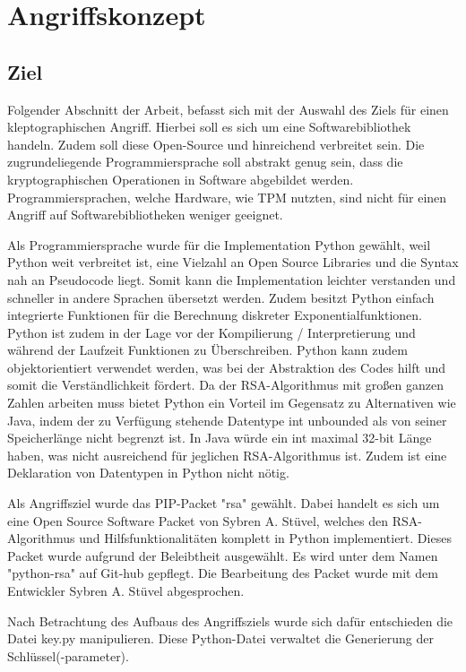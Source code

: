 \chapter{Angriffskonzept}

    \section{Ziel}
        Folgender Abschnitt der Arbeit, befasst sich mit der Auswahl des Ziels für einen kleptographischen Angriff. Hierbei soll es sich um eine Softwarebibliothek handeln. Zudem soll diese Open-Source und hinreichend verbreitet sein. Die zugrundeliegende Programmiersprache soll abstrakt genug sein, dass die kryptographischen Operationen in Software abgebildet werden. Programmiersprachen, welche Hardware, wie \ac{TPM} nutzten, sind nicht für einen Angriff auf Softwarebibliotheken weniger geeignet.

        Als Programmiersprache wurde für die Implementation Python gewählt, weil Python weit verbreitet ist, eine Vielzahl an Open Source Libraries und die Syntax nah an Pseudocode liegt. Somit kann die Implementation leichter verstanden und schneller in andere Sprachen übersetzt werden. Zudem besitzt Python einfach integrierte Funktionen für die Berechnung diskreter Exponentialfunktionen. Python ist zudem in der Lage vor der Kompilierung / Interpretierung und während der Laufzeit Funktionen zu Überschreiben. Python kann zudem objektorientiert verwendet werden, was bei der Abstraktion des Codes hilft und somit die Verständlichkeit fördert. Da der \ac{RSA}-Algorithmus mit großen ganzen Zahlen arbeiten muss bietet Python ein Vorteil im Gegensatz zu Alternativen wie Java, indem der zu Verfügung stehende Datentype int unbounded als von seiner Speicherlänge nicht begrenzt ist. In Java würde ein int maximal 32-bit Länge haben, was nicht ausreichend für jeglichen \ac{RSA}-Algorithmus ist. Zudem ist eine Deklaration von Datentypen in Python nicht nötig. 

        Als Angriffsziel wurde das PIP-Packet "rsa" gewählt. Dabei handelt es sich um eine Open Source Software Packet von Sybren A. Stüvel, welches den \ac{RSA}-Algorithmus und Hilfsfunktionalitäten komplett in Python implementiert. Dieses Packet wurde aufgrund der Beleibtheit ausgewählt. Es wird unter dem Namen "python-rsa" auf Git-hub gepflegt. Die Bearbeitung des Packet wurde mit dem Entwickler Sybren A. Stüvel abgesprochen.

        Nach Betrachtung des Aufbaus des Angriffsziels wurde sich dafür entschieden die Datei key.py manipulieren. Diese Python-Datei verwaltet die Generierung der Schlüssel(-parameter).
    
